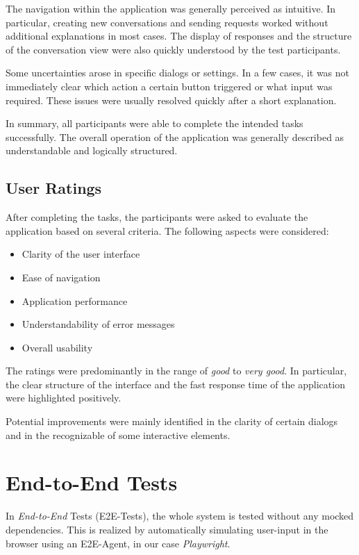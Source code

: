 The navigation within the application was generally perceived as intuitive.
In particular, creating new conversations and sending requests worked without
additional explanations in most cases.
The display of responses and the
structure of the conversation view were also quickly understood by the test
participants.

Some uncertainties arose in specific dialogs or settings.
In a few cases,
it was not immediately clear which action a certain button triggered or what
input was required.
These issues were usually resolved quickly after a short
explanation.

In summary, all participants were able to complete the intended tasks
successfully.
The overall operation of the application was generally described
as understandable and logically structured.

\subsection{User Ratings}

After completing the tasks, the participants were asked to evaluate the
application based on several criteria.
The following aspects were considered:

\begin{itemize}
    \item Clarity of the user interface
    \item Ease of navigation
    \item Application performance
    \item Understandability of error messages
    \item Overall usability
\end{itemize}

The ratings were predominantly in the range of \textit{good} to \textit{very good}.
In particular, the clear structure of the interface and the fast response time
of the application were highlighted positively.

Potential improvements were mainly identified in the clarity of certain dialogs
and in the recognizable of some interactive elements.

\section{End-to-End Tests}
In \textit{End-to-End} Tests (E2E-Tests), the whole system is tested without any mocked dependencies.
This is realized by automatically simulating user-input in the browser using an E2E-Agent, in our case \textit{Playwright}.

